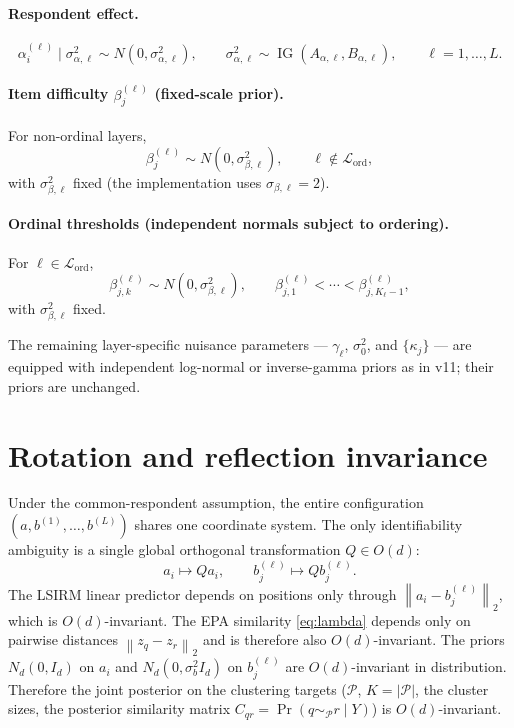 \documentclass[11pt]{article}
\newcommand{\norm}[1]{\left\lVert #1 \right\rVert}
\DeclareMathOperator{\IG}{IG}
\begin{document}
\paragraph{Respondent effect.}
\begin{equation}
    \alpha_i^{(\ell)}\mid\sigma_{\alpha,\ell}^2\sim N(0,\sigma_{\alpha,\ell}^2),
    \qquad
    \sigma_{\alpha,\ell}^2\sim\IG(A_{\alpha,\ell},B_{\alpha,\ell}),
    \qquad \ell=1,\dots,L.
    \label{eq:alpha-prior}
\end{equation}

\paragraph{Item difficulty $\beta_j^{(\ell)}$ (fixed-scale prior).}
For non-ordinal layers,
\begin{equation}
    \beta_j^{(\ell)}\sim N(0,\sigma_{\beta,\ell}^2),
    \qquad \ell\notin\mathcal L_{\mathrm{ord}},
    \label{eq:beta-prior}
\end{equation}
with $\sigma_{\beta,\ell}^2$ fixed (the implementation uses
$\sigma_{\beta,\ell}=2$).

\paragraph{Ordinal thresholds (independent normals subject to ordering).}
For $\ell\in\mathcal L_{\mathrm{ord}}$,
\begin{equation}
    \beta_{j,k}^{(\ell)}\sim N(0,\sigma_{\beta,\ell}^2),
    \qquad
    \beta_{j,1}^{(\ell)}<\cdots<\beta_{j,K_\ell-1}^{(\ell)},
    \label{eq:beta-thr-prior}
\end{equation}
with $\sigma_{\beta,\ell}^2$ fixed.

The remaining layer-specific nuisance parameters --- $\gamma_\ell$,
$\sigma_0^2$, and $\{\kappa_j\}$ --- are equipped with independent log-normal
or inverse-gamma priors as in v11; their priors are unchanged.

\section{Rotation and reflection invariance}
\label{sec:invariance}

Under the common-respondent assumption, the entire configuration
$(a,b^{(1)},\dots,b^{(L)})$ shares one coordinate system.  The only
identifiability ambiguity is a single global orthogonal transformation
$Q\in O(d)$:
\begin{equation}
    a_i\mapsto Qa_i,
    \qquad
    b_j^{(\ell)}\mapsto Qb_j^{(\ell)}.
\end{equation}
The LSIRM linear predictor depends on positions only through
$\norm{a_i-b_j^{(\ell)}}_2$, which is $O(d)$-invariant.  The EPA similarity
\eqref{eq:lambda} depends only on pairwise distances $\norm{z_q-z_r}_2$ and
is therefore also $O(d)$-invariant.  The priors $N_d(0,I_d)$ on $a_i$ and
$N_d(0,\sigma_b^2 I_d)$ on $b_j^{(\ell)}$ are $O(d)$-invariant in
distribution.  Therefore the joint posterior on the clustering targets
($\mathcal{P}$, $K=|\mathcal{P}|$, the cluster sizes, the posterior
similarity matrix $C_{qr}=\Pr(q\sim_{\mathcal{P}}r\mid Y)$) is $O(d)$-invariant.
\end{document}

